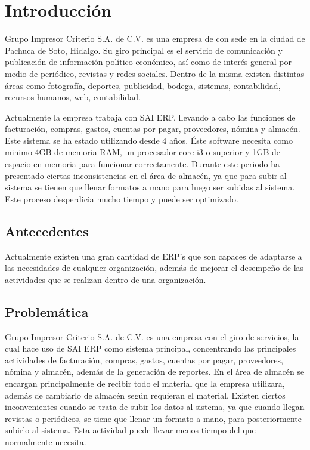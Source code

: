 \chapter{Introducción}
Grupo Impresor Criterio S.A. de C.V. es una empresa de con sede en la ciudad de Pachuca de Soto, Hidalgo. Su giro principal es el servicio de comunicación y publicación de información político-económico, así como de interés general por medio de periódico, revistas y redes sociales. Dentro de la misma existen distintas áreas como fotografía, deportes, publicidad, bodega, sistemas, contabilidad, recursos humanos, web, contabilidad.

Actualmente la empresa trabaja con SAI ERP, llevando a cabo las funciones de facturación, compras, gastos, cuentas por pagar, proveedores, nómina y almacén. Este sistema se ha estado utilizando desde 4 años. Éste software necesita como minimo 4GB de memoria RAM, un procesador core i3 o superior y 1GB de espacio en  memoria para funcionar correctamente.  Durante este periodo ha presentado ciertas inconsistencias en el área de almacén, ya que para subir al sistema se tienen que llenar formatos a mano para luego ser subidas al sistema. Este proceso desperdicia mucho tiempo y puede ser optimizado.

\section{Antecedentes}
Actualmente existen una gran cantidad de ERP's que son capaces de adaptarse a las necesidades de cualquier organización, además de mejorar el desempeño de las actividades que se realizan dentro de una organización.

\section{Problemática}
Grupo Impresor Criterio S.A. de C.V. es una empresa con el giro de servicios, la cual hace uso de SAI ERP como sistema principal, concentrando las principales actividades de facturación, compras, gastos, cuentas por pagar, proveedores, nómina y almacén, además de la generación de reportes. En el área de almacén se encargan principalmente de recibir todo el material que la empresa utilizara, además de cambiarlo de almacén según requieran el material. Existen ciertos inconvenientes cuando se trata de subir los datos al sistema, ya que cuando llegan revistas o periódicos, se tiene que llenar un formato a mano, para posteriormente subirlo al sistema. Esta actividad puede llevar menos tiempo del que normalmente necesita.


